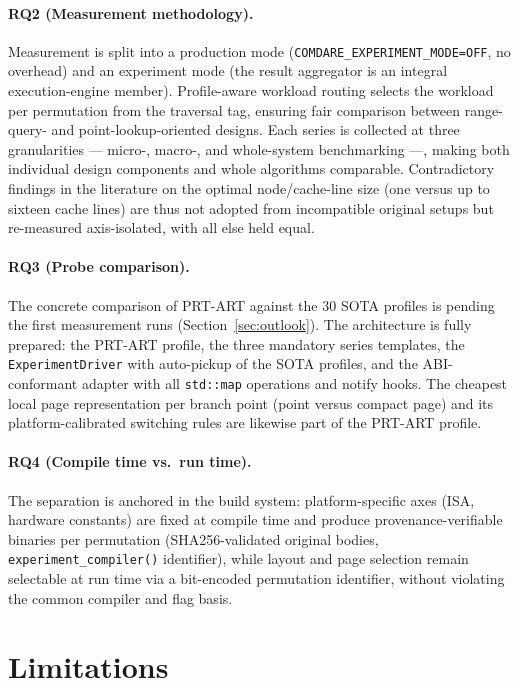 \paragraph{RQ2 (Measurement methodology).} Measurement is split into a production mode
(\texttt{COMDARE\_\allowbreak{}EXPERIMENT\_\allowbreak{}MODE=OFF}, no overhead) and an experiment mode
(the result aggregator is an integral execution-engine member). Profile-aware workload routing
selects the workload per permutation from the traversal tag, ensuring fair comparison between
range-query- and point-lookup-oriented designs. Each series is collected at three granularities ---
micro-, macro-, and whole-system benchmarking ---, making both individual design components and
whole algorithms comparable. Contradictory findings in the literature on the optimal node/cache-line
size (one versus up to sixteen cache lines) are thus not adopted from incompatible original setups
but re-measured axis-isolated, with all else held equal.

\paragraph{RQ3 (Probe comparison).} The concrete comparison of PRT-ART against the 30 SOTA
profiles is pending the first measurement runs (Section~\ref{sec:outlook}). The architecture is
fully prepared: the PRT-ART profile, the three mandatory series templates, the
\texttt{ExperimentDriver} with auto-pickup of the SOTA profiles, and the ABI-conformant adapter with
all \texttt{std::map} operations and notify hooks. The cheapest local page representation per branch
point (point versus compact page) and its platform-calibrated switching rules are likewise part of
the PRT-ART profile.

\paragraph{RQ4 (Compile time vs.\ run time).} The separation is anchored in the build system:
platform-specific axes (ISA, hardware constants) are fixed at compile time and produce
provenance-verifiable binaries per permutation (SHA256-validated original bodies,
\texttt{experiment\_compiler()} identifier), while layout and page selection remain selectable at
run time via a bit-encoded permutation identifier, without violating the common compiler and flag
basis.

\section{Limitations}\label{sec:limitations}

